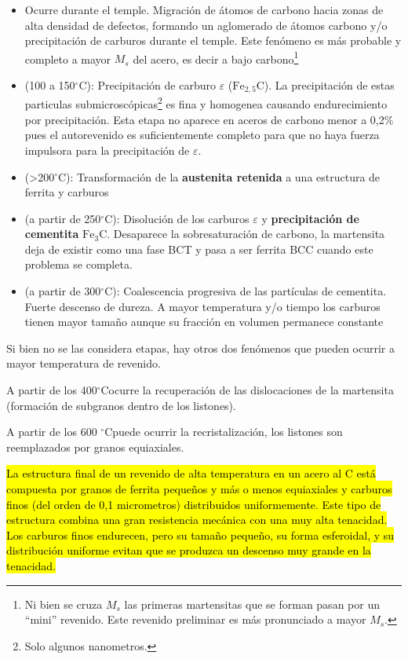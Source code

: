 \documentclass{article}
\newcommand{\grad}{\ensuremath{^\circ \mathrm{C}}}
\newcommand{\cementita}{\ensuremath{\mathrm{Fe}_3 \mathrm{C}}}
\begin{document}
\begin{itemize}
    \item[Autorevenido] Ocurre durante el temple. Migración de átomos de carbono hacia zonas de alta densidad de defectos, formando un aglomerado de átomos carbono y/o precipitación de carburos durante el temple. Este fenómeno es más probable y completo a mayor $M_s$ del acero, es decir a bajo carbono\footnote{Ni bien se cruza $M_s$ las primeras martensitas que se forman pasan por un ``mini'' revenido. Este revenido preliminar es más pronunciado a mayor $M_s$.}
    \item[Etapa 1] (100 a 150\grad): Precipitación de carburo $\varepsilon$ ($\mathrm{Fe}_{2,5}\mathrm{C}$). La precipitación de estas particulas submicroscópicas\footnote{Solo algunos nanometros.} es fina y homogenea causando endurecimiento por precipitación. Esta etapa no aparece en aceros de carbono menor a 0,2\% pues el autorevenido es suficientemente completo para que no haya fuerza impulsora para la precipitación de $\varepsilon$.
    \item[Etapa 2] (>200\grad): Transformación de la\textbf{ austenita retenida} a una estructura de ferrita y carburos
    \item [Etapa 3] (a partir de 250\grad): Disolución de los carburos $\varepsilon$ y \textbf{precipitación de cementita} \cementita. Desaparece la sobresaturación de carbono, la martensita deja de existir como una fase BCT y pasa a ser ferrita BCC cuando este problema se completa.
    \item[Etapa 4] (a partir de 300\grad): Coalescencia progresiva de las partículas de cementita. Fuerte descenso de dureza. A mayor temperatura y/o tiempo los carburos tienen mayor tamaño aunque su fracción en volumen permanece constante
\end{itemize}

Si bien no se las considera etapas, hay otros dos fenómenos que pueden
ocurrir a mayor temperatura de revenido.

A partir de los 400\grad ocurre la recuperación de las dislocaciones de la
martensita (formación de subgranos dentro de los listones).


A partir de los 600 \grad puede ocurrir la recristalización, los listones son
reemplazados por granos equiaxiales.

\hl{La estructura final de un revenido de alta temperatura en un acero al C
está compuesta por granos de ferrita pequeños y más o menos equiaxiales
y carburos finos (del orden de 0,1 micrometros) distribuidos uniformemente. Este
tipo de estructura combina una gran resistencia mecánica con una
muy alta tenacidad. Los carburos finos endurecen, pero su tamaño
pequeño, su forma esferoidal, y su distribución uniforme evitan que se
produzca un descenso muy grande en la tenacidad.}
\end{document}
